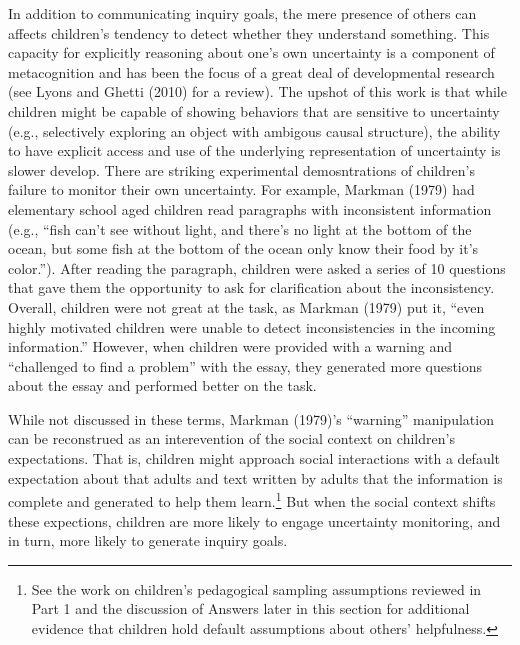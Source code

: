 \documentclass[english,floatsintext,man]{apa6}
\theoremstyle{definition}
\theoremstyle{definition}
\theoremstyle{definition}
\theoremstyle{remark}
\begin{document}
In addition to communicating inquiry goals, the mere presence of others
can affects children's tendency to detect whether they understand
something. This capacity for explicitly reasoning about one's own
uncertainty is a component of metacognition and has been the focus of a
great deal of developmental research (see Lyons and Ghetti (2010) for a
review). The upshot of this work is that while children might be capable
of showing behaviors that are sensitive to uncertainty (e.g.,
selectively exploring an object with ambigous causal structure), the
ability to have explicit access and use of the underlying representation
of uncertainty is slower develop. There are striking experimental
demosntrations of children's failure to monitor their own uncertainty.
For example, Markman (1979) had elementary school aged children read
paragraphs with inconsistent information (e.g., \enquote{fish can't see
without light, and there's no light at the bottom of the ocean, but some
fish at the bottom of the ocean only know their food by it's color.}).
After reading the paragraph, children were asked a series of 10
questions that gave them the opportunity to ask for clarification about
the inconsistency. Overall, children were not great at the task, as
Markman (1979) put it, \enquote{even highly motivated children were
unable to detect inconsistencies in the incoming information.} However,
when children were provided with a warning and \enquote{challenged to
find a problem} with the essay, they generated more questions about the
essay and performed better on the task.

While not discussed in these terms, Markman (1979)'s \enquote{warning}
manipulation can be reconstrued as an interevention of the social
context on children's expectations. That is, children might approach
social interactions with a default expectation about that adults and
text written by adults that the information is complete and generated to
help them learn.\footnote{See the work on children's pedagogical
  sampling assumptions reviewed in Part 1 and the discussion of Answers
  later in this section for additional evidence that children hold
  default assumptions about others' helpfulness.} But when the social
context shifts these expections, children are more likely to engage
uncertainty monitoring, and in turn, more likely to generate inquiry
goals.
\end{document}
